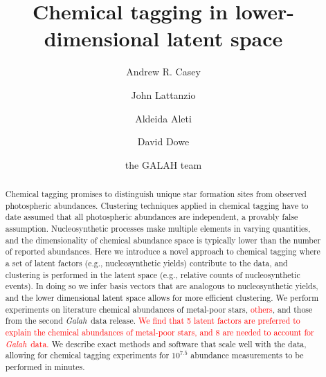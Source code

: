 \documentclass[twocolumn]{aastex62}
\newcommand{\project}[1]{\textsl{#1}}
\newcommand{\Galah}{\project{Galah}}
\newcommand{\todo}[1]{\textcolor{red}{#1}}
\begin{document}
\title{Chemical tagging in lower-dimensional latent space}


\author[0000-0003-0174-0564]{Andrew R. Casey}
			 
\author{John Lattanzio}

\author{Aldeida Aleti}

\author{David Dowe}
			 
\author{the GALAH team}


\begin{abstract}
Chemical tagging promises to distinguish unique star formation sites from 
observed photospheric abundances.
Clustering techniques applied in chemical tagging have to date assumed that
all photospheric abundances are independent, a provably false assumption.
Nucleosynthetic processes make multiple elements in varying quantities, and the
dimensionality of chemical abundance space is typically lower than the 
number of reported abundances. 
Here we introduce a novel approach to chemical tagging where a set of 
latent factors (e.g., nucleosynthetic yields) contribute to the
data, and clustering is performed in the latent space (e.g., relative counts of
nucleosynthetic events). In doing so we infer basis vectors that are analogous
to nucleosynthetic yields, and the lower dimensional latent space allows for
more efficient clustering. We perform experiments on literature chemical abundances
of metal-poor stars, \todo{others}, and 
those from the second \Galah\ data release. \todo{We find that 5 latent factors are
preferred to explain the chemical abundances of metal-poor stars, and 8 are
needed to account for \Galah\ data.}
We describe exact methods and software that scale well with the data,
allowing for chemical tagging experiments for $10^{7.5}$ abundance measurements
to be performed in minutes.
\end{abstract}
\end{document}

